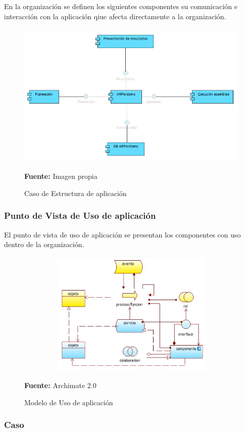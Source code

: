 En la organización se definen los siguientes componentes su comunicación e interacción con la aplicación qiue afecta directamente a la organización.

\begin{figure}[th!]
	\centering
	\includegraphics[width=13cm,height=7cm]{arquitectura/aplicacion/imgs/estructura}
	\caption{Caso de Estructura de aplicación}{\scriptsize \textbf{Fuente:} Imagen propia}
\end{figure}


\subsubsection{Punto de Vista de Uso de aplicación}

El punto de vista de uso de aplicación se presentan los componentes con uso dentro de la organización.


\begin{figure}[th!]
	\centering
	\includegraphics[width=13cm,height=6cm]{arquitectura/aplicacion/imgs/uso-e}
	\caption{Modelo de Uso de aplicación}{\scriptsize \textbf{Fuente:} Archimate 2.0 \cite{WEB7}}
\end{figure}

\subsubsection{Caso}

